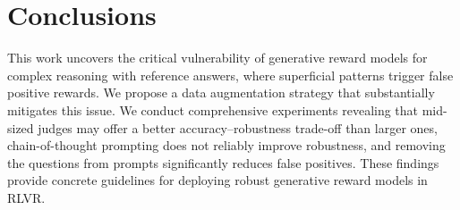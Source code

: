 \section{Conclusions}
\vspace{-1.5mm}
 This work uncovers the critical vulnerability of generative reward models for complex reasoning with reference answers, where superficial patterns trigger false positive rewards. We propose a data augmentation strategy that substantially mitigates this issue. We conduct comprehensive experiments revealing that mid-sized judges may offer a better accuracy–robustness trade-off than larger ones, chain-of-thought prompting does not reliably improve robustness, and removing the questions from prompts significantly reduces false positives. These findings provide concrete guidelines for deploying robust generative reward models in RLVR.
